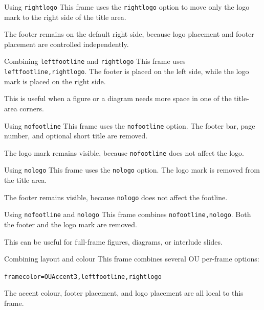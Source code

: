 \documentclass[10pt,aspectratio=169]{beamer}
\begin{document}
\begin{frame}[t,rightlogo]{Using \texttt{rightlogo}}
This frame uses the \texttt{rightlogo} option to move only the logo mark to the right side of the title area.

The footer remains on the default right side, because logo placement and footer placement are controlled independently.
\end{frame}

\begin{frame}{Combining \texttt{leftfootline} and \texttt{rightlogo}}
This frame uses \texttt{leftfootline,rightlogo}. The footer is placed on the left side, while the logo mark is placed on the right side.

This is useful when a figure or a diagram needs more space in one of the title-area corners.
\end{frame}

\begin{frame}[t,nofootline]{Using \texttt{nofootline}}
This frame uses the \texttt{nofootline} option. The footer bar, page number, and optional short title are removed.

The logo mark remains visible, because \texttt{nofootline} does not affect the logo.
\end{frame}

\begin{frame}[t,nologo]{Using \texttt{nologo}}
This frame uses the \texttt{nologo} option. The logo mark is removed from the title area.

The footer remains visible, because \texttt{nologo} does not affect the footline.
\end{frame}

\begin{frame}{Using \texttt{nofootline} and \texttt{nologo}}
This frame combines \texttt{nofootline,nologo}. Both the footer and the logo mark are removed.

This can be useful for full-frame figures, diagrams, or interlude slides.
\end{frame}

\begin{frame}[t,framecolor=OUAccent3,leftfootline,rightlogo]{Combining layout and colour}
This frame combines several OU per-frame options:

\medskip
\texttt{framecolor=OUAccent3,leftfootline,rightlogo}

\medskip
The accent colour, footer placement, and logo placement are all local to this frame.
\end{frame}
\end{document}
